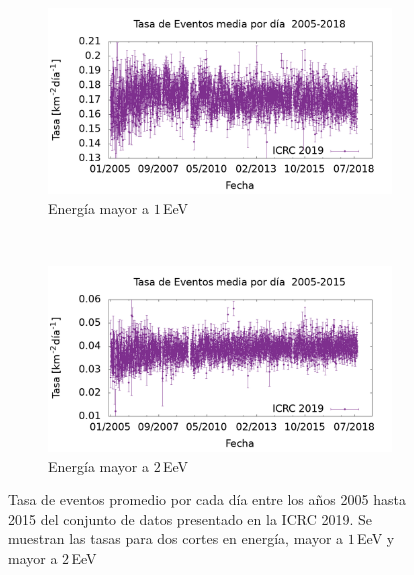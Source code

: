         \begin{figure}[H]
            \centering
            \begin{subfigure}[b]{0.5\textwidth}
            \includegraphics[width=\textwidth]{Graphs/rate_dayly/1EeV_ICRC_2019_05_18.png}
            \caption{Energía mayor a $1\,$EeV}
            \label{fig:rate_day_ICRC_19_05_18}
            \end{subfigure}\\
            \begin{subfigure}[b]{0.5\textwidth}
            \includegraphics[width=\textwidth]{Graphs/rate_dayly/2EeV_ICRC_2019_05_19.png}
            \caption{ Energía mayor a $2\,$EeV}
            \label{fig:rate_2015_ICRC_19_05_18}
            \end{subfigure}%
            \caption{Tasa de eventos promedio por cada día entre los años 2005 hasta 2015 del conjunto de datos presentado en la ICRC 2019. Se muestran las tasas para dos cortes en energía, mayor a $1\,$EeV y mayor a $2\,$EeV}\label{fig:rate_new_18}
        \end{figure}
